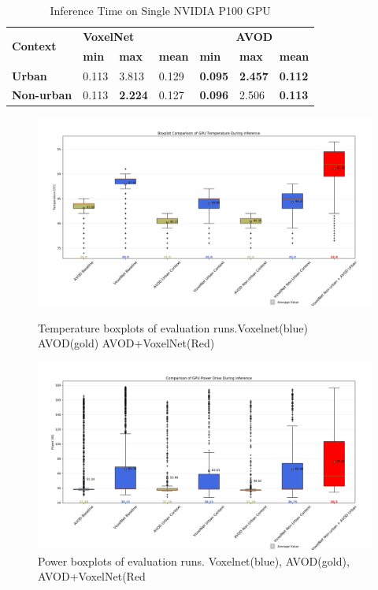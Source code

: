 \begin{table}[h]%
	\centering
	\begin{tabular}{|l|l|l|l|l|l|l|}
		\hline
		\multirow{2}{*}{\textbf{Context}} & \multicolumn{3}{l|}{\textbf{VoxelNet}} & \multicolumn{3}{c|}{\textbf{AVOD}} \\ \cline{2-7} 
		& \textbf{min} & \textbf{max} & \textbf{mean} & \textbf{min} & \textbf{max} & \textbf{mean} \\ \hline
		\textbf{Urban} & 0.113 & 3.813 & 0.129 & \textbf{0.095} & \textbf{2.457} & \textbf{0.112} \\ \hline
		\textbf{Non-urban} & 0.113 & \textbf{2.224} & 0.127 & \textbf{0.096} & 2.506 & \textbf{0.113} \\ \hline
	\end{tabular}%
	\caption{Inference Time on Single NVIDIA P100 GPU}
	\label{tab:inftime}
\end{table}
\begin{figure}[h] %
	\centering
	\begin{minipage}[b]{0.7\textwidth}
		\includegraphics[width=\textwidth]{images/gputepbox.png}
		\caption{Temperature boxplots of evaluation runs.Voxelnet(blue) AVOD(gold) AVOD+VoxelNet(Red)}
		\label{fig:temp}
	\end{minipage}
	\begin{minipage}[b]{0.7\textwidth}
		\includegraphics[width=\textwidth]{images/gpupbox.png}
		\caption{Power boxplots of evaluation runs. Voxelnet(blue), AVOD(gold), AVOD+VoxelNet(Red}
		\label{fig:power}
	\end{minipage}
	
\end{figure}


